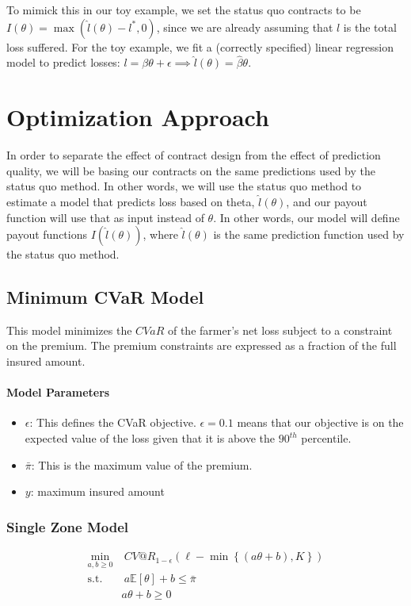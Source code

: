 \documentclass[11pt]{article}
\begin{document}
To mimick this in our toy example, we set the status quo contracts to be $I(\theta) = \max(\hat{l}(\theta)-l^*,0)$, since we are already assuming that $l$ is the total loss suffered. For the toy example, we fit a (correctly specified) linear regression model to predict losses: $l = \beta \theta + \epsilon \implies \hat{l}(\theta) = \hat{\beta}\theta$. 

\section{Optimization Approach}
In order to separate the effect of contract design from the effect of prediction quality, we will be basing our contracts on the same predictions used by the status quo method. In other words, we will use the status quo method to estimate a model that predicts loss based on theta, $\hat{l}(\theta)$, and our payout function will use that as input instead of $\theta$. In other words, our model will define payout functions $I(\hat{l}(\theta))$, where $\hat{l}(\theta)$ is the same prediction function used by the status quo method. 

\subsection*{Minimum CVaR Model}
    This model minimizes the $CVaR$ of the farmer's net loss subject to a constraint on the premium. The premium constraints are expressed as a fraction of the full insured amount. 
    \paragraph*{Model Parameters}
    \begin{itemize}
        \item $\epsilon$: This defines the CVaR objective. $\epsilon = 0.1$ means that our objective is on the expected value of the loss given that it is above the $90^{th}$ percentile. 
        \item $\bar{\pi}$: This is the maximum value of the premium. 
        \item $y$: maximum insured amount
    \end{itemize}

    \subsubsection*{Single Zone Model}

    \begin{align}
        \min_{a,b\geq 0} &\ CV@R_{1-\epsilon}\left(\ell  - \min\left\{(a\theta + b), K\right\} \right)\\
        \text{s.t.   } &\   a \mathbb{E} \left[\theta \right] + b\label{eq-02} \leq \bar{\pi}\\
        & a\theta + b \geq 0 
    \end{align}
\end{document}
